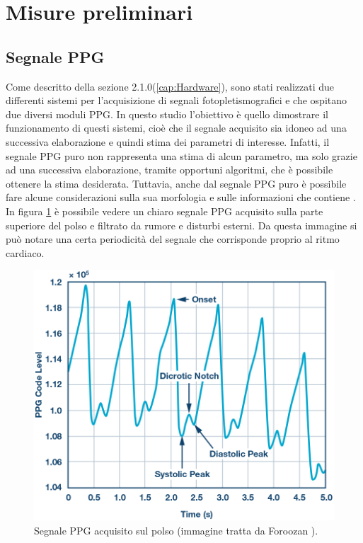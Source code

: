 \section{Misure preliminari}
\subsection{Segnale PPG}
Come descritto della sezione 2.1.0(\ref{cap:Hardware}), sono stati realizzati due differenti sistemi per l'acquisizione di segnali fotopletismografici e che ospitano due diversi moduli PPG. In questo studio l'obiettivo è quello dimostrare il funzionamento di questi sistemi, cioè che il segnale acquisito sia idoneo ad una successiva elaborazione e quindi stima dei parametri di interesse. Infatti, il segnale PPG puro non rappresenta una stima di alcun parametro, ma solo grazie ad una successiva elaborazione, tramite opportuni algoritmi, che è possibile ottenere la stima desiderata.
Tuttavia, anche dal segnale PPG puro è possibile fare alcune considerazioni sulla sua morfologia e sulle informazioni che contiene \cite{Foroozan2018}. In figura \ref{fig:Descrizione_Segnale_PPG} è possibile vedere un chiaro segnale PPG acquisito sulla parte superiore del polso e filtrato da rumore e disturbi esterni. Da questa immagine si può notare una certa periodicità del segnale che corrisponde proprio al ritmo cardiaco.
\begin{figure}[h]
	\centering
	\includegraphics[width=0.8\linewidth]{ImageFiles/Misure Preliminari/descrizione_segnale_ppg}
	\caption{Segnale PPG acquisito sul polso (immagine tratta da Foroozan \cite{Foroozan2018}).}
	\label{fig:Descrizione_Segnale_PPG}
\end{figure}
